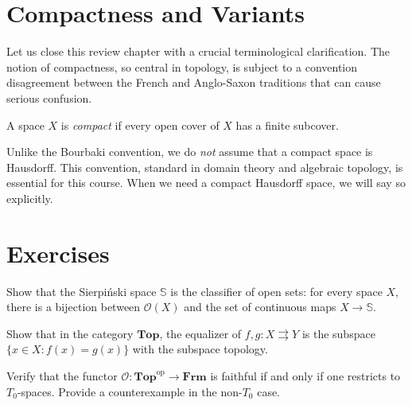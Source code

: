 \section{Compactness and Variants}

Let us close this review chapter with a crucial terminological clarification.
The notion of compactness, so central in topology, is subject to a
convention disagreement between the French and Anglo-Saxon traditions that
can cause serious confusion.

\begin{definition}[Compactness]
A space $X$ is \emph{compact} if every open cover of $X$ has a finite subcover.
\end{definition}

\begin{warning}
Unlike the Bourbaki convention, we do \emph{not} assume that a compact space is
Hausdorff. This convention, standard in domain theory and algebraic topology, is
essential for this course. When we need a compact Hausdorff space, we will say so
explicitly.
\end{warning}

\section{Exercises}

\begin{exercise}
Show that the Sierpi\'nski space $\mathbb{S}$ is the classifier of open sets: for every
space $X$, there is a bijection between $\mathcal{O}(X)$ and the set of continuous maps
$X \to \mathbb{S}$.
\end{exercise}

\begin{exercise}
Show that in the category $\mathbf{Top}$, the equalizer of $f,g\colon X
\rightrightarrows Y$ is the subspace $\{x \in X : f(x) = g(x)\}$ with the subspace
topology.
\end{exercise}

\begin{exercise}
Verify that the functor $\mathcal{O}\colon \mathbf{Top}^{\mathrm{op}} \to \mathbf{Frm}$
is faithful if and only if one restricts to $T_0$-spaces. Provide a counterexample in the
non-$T_0$ case.
\end{exercise}

